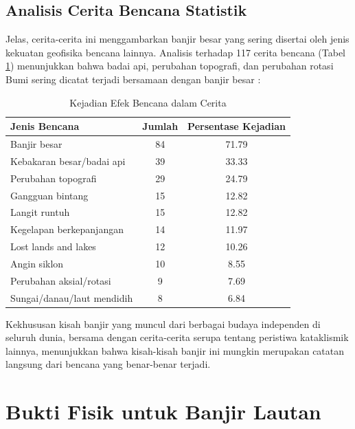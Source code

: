\documentclass[10pt,twocolumn,letterpaper]{article}
\begin{document}
\subsection{Analisis Cerita Bencana Statistik}

Jelas, cerita-cerita ini menggambarkan banjir besar yang sering disertai oleh jenis kekuatan geofisika bencana lainnya. Analisis terhadap 117 cerita bencana (Tabel \ref{tab: 1}) menunjukkan bahwa badai api, perubahan topografi, dan perubahan rotasi Bumi sering dicatat terjadi bersamaan dengan banjir besar \cite{14}:

\begin{table}[ht]
\begin{center}
\renewcommand{\arraystretch}{1.2}  %
\begin{tabular}{|l|c|c|}
\hline
\textbf{Jenis Bencana} & \textbf{Jumlah} & \textbf{Persentase Kejadian} \\
\hline\hline
Banjir besar            & 84 & 71.79 \\
Kebakaran besar/badai api & 39 & 33.33 \\
Perubahan topografi   & 29 & 24.79 \\
Gangguan bintang     & 15 & 12.82 \\
Langit runtuh           & 15 & 12.82 \\
Kegelapan berkepanjangan      & 14 & 11.97 \\
Lost lands and lakes    & 12 & 10.26 \\
Angin siklon            & 10 & 8.55  \\
Perubahan aksial/rotasi & 9 & 7.69  \\
Sungai/danau/laut mendidih & 8 & 6.84 \\
\hline
\end{tabular}
\end{center}
\caption{Kejadian Efek Bencana dalam Cerita}
\label{tab: 1}
\end{table}

Kekhususan kisah banjir yang muncul dari berbagai budaya independen di seluruh dunia, bersama dengan cerita-cerita serupa tentang peristiwa kataklismik lainnya, menunjukkan bahwa kisah-kisah banjir ini mungkin merupakan catatan langsung dari bencana yang benar-benar terjadi.

\section{Bukti Fisik untuk Banjir Lautan}
\end{document}
